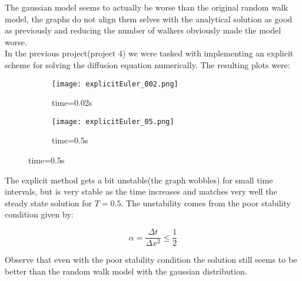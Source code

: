 \documentclass[a4paper,11pt]{article}
\newcommand{\vsp}{\vspace{0.2cm}} %
\begin{document}
    The gaussian model seems to actually be worse than the original random walk model, the graphs do not align them selves with the analytical solution as good as previously and reducing the number of walkers obviously made the model worse.\vsp \\
    In the previous project(project 4) we were tasked with implementing an explicit scheme for solving the diffusion equation numerically. The resulting plots were:
    \begin{figure}[H]
        \caption{Explicit forward Euler $\Delta x=1./100, \Delta t=(\Delta x^2/2)$}
        \captionsetup[subfigure]{labelformat=empty}
        \begin{subfigure}[b!]{0.55\textwidth}
            \texttt{[image: explicitEuler\_002.png]}
            \caption{time=0.02s}
        \end{subfigure}
        \begin{subfigure}[b!]{0.55\textwidth}
            \texttt{[image: explicitEuler\_05.png]}
            \caption{time=0.5s}
        \end{subfigure}
    \end{figure} \justify
    
    The explicit method gets a bit unstable(the graph wobbles) for small time intervals, but is very stable as the time increases and matches very well the steady state solution for $T=0.5$. The unstability comes from the poor stability condition given by:
    
    \begin{equation*}
        \alpha = \frac{\Delta t}{\Delta x^2} \leq \frac{1}{2}
    \end{equation*} \justify
    
    Observe that even with the poor stability condition the solution still seems to be better than the random walk model with the gaussian distribution.
\end{document}
